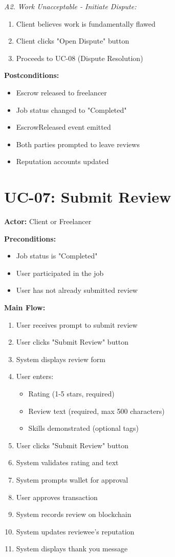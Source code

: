 \documentclass[a4paper,13pt,twoside]{report}
\theoremstyle{definition}
\begin{document}
\textit{A2. Work Unacceptable - Initiate Dispute:}
\begin{enumerate}
    \item Client believes work is fundamentally flawed
    \item Client clicks "Open Dispute" button
    \item Proceeds to UC-08 (Dispute Resolution)
\end{enumerate}

\textbf{Postconditions:}
\begin{itemize}
    \item Escrow released to freelancer
    \item Job status changed to "Completed"
    \item EscrowReleased event emitted
    \item Both parties prompted to leave reviews
    \item Reputation accounts updated
\end{itemize}

\section{UC-07: Submit Review}

\textbf{Actor:} Client or Freelancer

\textbf{Preconditions:}
\begin{itemize}
    \item Job status is "Completed"
    \item User participated in the job
    \item User has not already submitted review
\end{itemize}

\textbf{Main Flow:}
\begin{enumerate}
    \item User receives prompt to submit review
    \item User clicks "Submit Review" button
    \item System displays review form
    \item User enters:
    \begin{itemize}
        \item Rating (1-5 stars, required)
        \item Review text (required, max 500 characters)
        \item Skills demonstrated (optional tags)
    \end{itemize}
    \item User clicks "Submit Review" button
    \item System validates rating and text
    \item System prompts wallet for approval
    \item User approves transaction
    \item System records review on blockchain
    \item System updates reviewee's reputation
    \item System displays thank you message
\end{enumerate}
\end{document}
